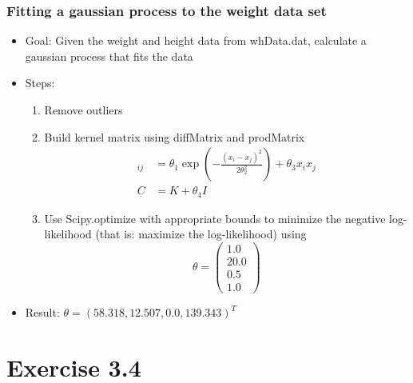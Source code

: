 \documentclass[10pt,aspectratio=169,handout]{beamer}
\begin{document}
\begin{frame}
    \frametitle{Fitting a gaussian process to the weight data set}

    \begin{itemize}
        \item Goal: Given the weight and height data from whData.dat, calculate a gaussian process that fits the data
        \item Steps:
            \begin{enumerate}
                \item Remove outliers
                \item Build kernel matrix using  diffMatrix and prodMatrix 
                \begin{align*}
                    [K]_{ij} &= \theta_1\exp\left(-\frac{(x_i-x_j)^2}{2\theta_2^2}\right)+\theta_3 x_ix_j \\
                    C& = K + \theta_4 I
                \end{align*}
                \item Use Scipy.optimize with appropriate bounds to minimize the negative log-likelihood (that is: maximize the log-likelihood)
                using \[\theta=\begin{pmatrix}1.0\\ 20.0\\0.5\\1.0\end{pmatrix}\]
            \end{enumerate}
        \item Result: $\theta=(58.318, 12.507, 0.0, 139.343)^T$
    \end{itemize}

\end{frame}

\section{Exercise 3.4}
\end{document}
